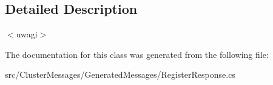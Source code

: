 \subsection{Detailed Description}
$<$uwagi$>$ 

The documentation for this class was generated from the following file\+:\begin{DoxyCompactItemize}
\item 
src/\+Cluster\+Messages/\+Generated\+Messages/Register\+Response.\+cs\end{DoxyCompactItemize}
